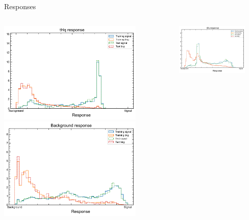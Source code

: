 

\begin{frame}{Responses}
    \begin{columns}
        \begin{column}{0.5\textwidth}
            \includegraphics[width=0.8\textwidth]{response_lephad}
            \includegraphics[width=0.8\textwidth]{bkg_lephad}
        \end{column}
        \begin{column}{0.5\textwidth}
            \includegraphics[width=0.8\textwidth]{tZq_lephad}

\end{column}
\end{columns}
\end{frame}
